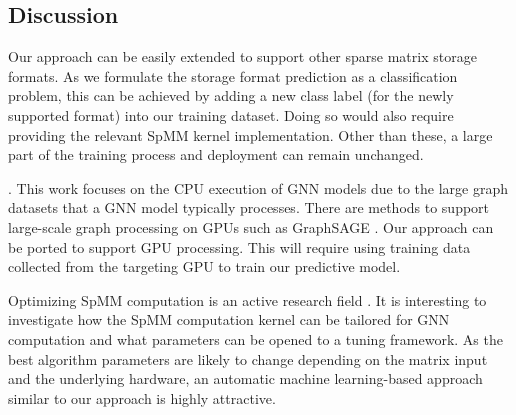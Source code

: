 \vspace{-4mm}
\subsection{Discussion}
\vspace{-3mm}

 Our approach can be easily extended to support other sparse matrix storage formats. As we
formulate the storage format prediction as a classification problem, this can be achieved by adding a new class label (for the newly
supported format) into our training dataset. Doing so would also require providing the relevant SpMM kernel implementation. Other than
these, a large part of the training process and deployment can remain unchanged.

. This work focuses on the CPU execution of GNN models due to the large graph datasets that a GNN
model typically processes. There are methods to support large-scale graph processing on GPUs such as GraphSAGE
\cite{hamilton2017inductive}. Our approach can be ported to support GPU processing. This will require using training data collected from
the targeting GPU to train our predictive model. %

 Optimizing SpMM computation is an active research field \cite{dalton2015optimizing}. It is interesting to investigate how the SpMM computation kernel can be tailored for GNN computation and what parameters can be opened to a tuning framework. As the best algorithm parameters are likely to change depending on the matrix input and the underlying hardware, an automatic machine learning-based approach similar to our approach is highly attractive.
